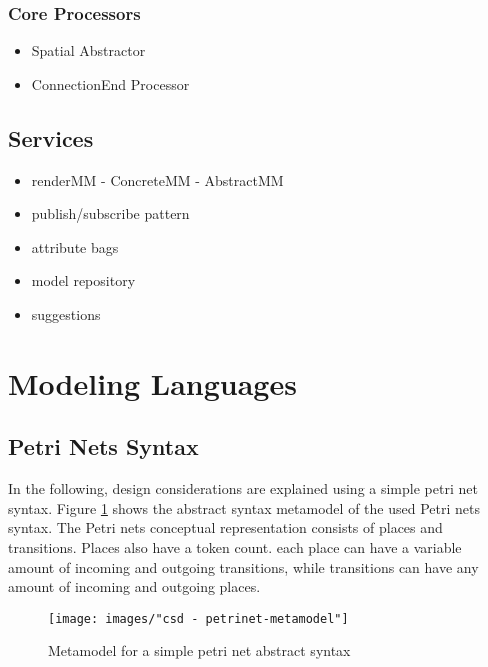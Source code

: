 \subsubsection{Core Processors}
\begin{itemize}
  \item Spatial Abstractor 
  \item ConnectionEnd Processor
\end{itemize}

\subsection{Services}



\begin{itemize}
  \item renderMM - ConcreteMM - AbstractMM
  \item publish/subscribe pattern
  \item attribute bags
  \item model repository
  \item suggestions
\end{itemize}

\section{Modeling Languages}

\comment{\dots}

\subsection{Petri Nets Syntax}
In the following, design considerations are explained using a simple petri net syntax. Figure \ref{fig:petrinets_metamodel} shows the abstract syntax metamodel of the used Petri nets syntax. The Petri nets conceptual representation consists of places and transitions. Places also have a token count. each place can have a variable amount of incoming and outgoing transitions, while transitions can have any amount of incoming and outgoing places. 

\begin{figure}[H]
  \centering
  \texttt{[image: images/"csd - petrinet-metamodel"]}
  \caption{Metamodel for a simple petri net abstract syntax}
  \label{fig:petrinets_metamodel}
\end{figure}

